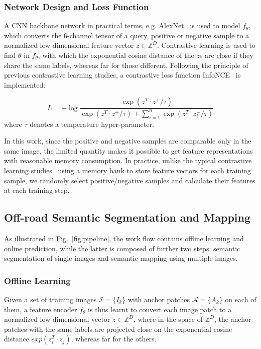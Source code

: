 \documentclass[letterpaper, 10 pt, conference]{ieeeconf}  %
\begin{document}
\subsubsection{Network Design and Loss Function}
A CNN backbone network in practical terms, e.g. AlexNet~\cite{krizhevsky2012imagenet} is used to model $f_{\theta}$, which converts the 6-channel tensor of a query, positive or negative sample to a normalized low-dimensional feature vector $z\in \mathbb{Z}^D$.
Contrastive learning is used to find $\theta$ in $f_{\theta}$, with which the exponential cosine distance of the $z$s are close if they share the same labels, whereas far for those different.
Following the principle of previous contrastive learning studies, a contrastive loss function InfoNCE~\cite{oord2018representation} is implemented:

\vspace{-2mm}
\begin{equation}\label{loss}
L=-\log {\dfrac{\exp (z^T \cdot z^+/\tau)}{\exp (z^T \cdot z^+/\tau)+\sum_{i=1}^{n}{\exp (z^T \cdot z_i^-/\tau)}}}
\end{equation}
where $\tau$ denotes a temperature hyper-parameter.

In this work, since the positive and negative samples are comparable only in the same image, the limited quantity makes it possible to get feature representations with reasonable memory consumption. In practice, unlike the typical contrastive learning studies~\cite{Wu_2018_CVPR} using a memory bank to store feature vectors for each training sample, we randomly select positive/negative samples and calculate their features at each training step.

\subsection{Off-road Semantic Segmentation and Mapping}

As illustrated in Fig.~\ref{fig:pipeline}, the work flow contains offline learning and online prediction, while the latter is composed of further two steps: semantic segmentation of single images and semantic mapping using multiple images.

\subsubsection{Offline Learning}
Given a set of training images $\mathcal{I}=\{I_k\}$ with anchor patches $\mathcal{A}=\{A_k\}$ on each of them, a feature encoder $f_\theta$ is thus learnt to convert each image patch to a normalized low-dimensional vector $z\in \mathbb{Z}^D$, where in the space of $\mathbb{Z}^D$, the anchor patches with the same labels are projected close on the exponential cosine distance $exp(z_i^T \cdot z_j)$, whereas far for the others.
\end{document}
